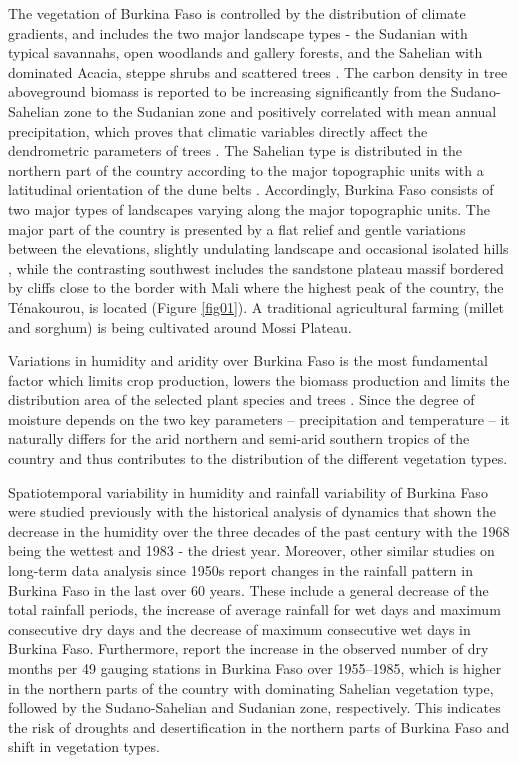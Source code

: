 \documentclass[atmosphere,article,submit,pdftex,moreauthors]{Definitions/mdpi}
\begin{document}
The vegetation of Burkina Faso is controlled by the distribution of climate gradients, and includes the two major landscape types - the Sudanian with typical savannahs, open woodlands and gallery forests, and the Sahelian with dominated Acacia, steppe shrubs and scattered trees \cite{da2010spatial}. The carbon density in tree aboveground biomass is reported to be increasing significantly from the Sudano-Sahelian zone to the Sudanian zone and positively correlated with mean annual precipitation, which proves that climatic variables directly affect the dendrometric parameters of trees \cite{BALIMA2021100123}. The Sahelian type is distributed in the northern part of the country according to the major topographic units with a latitudinal orientation of the dune belts \cite{Ballouche}. Accordingly, Burkina Faso consists of two major types of landscapes varying along the major topographic units. The major part of the country is presented by a flat relief and gentle variations between the elevations, slightly undulating landscape and occasional isolated hills \cite{Nebie}, while the contrasting southwest includes the sandstone plateau massif bordered by cliffs close to the border with Mali where the highest peak of the country, the Ténakourou, is located (Figure \ref{fig01}). A traditional agricultural farming (millet and sorghum) is being cultivated around Mossi Plateau. 

Variations in humidity and aridity over Burkina Faso is the most fundamental factor which limits crop production, lowers the biomass production and limits the distribution area of the selected plant species and trees \cite{dimobe2020climate,ADJONOU2020e04031,DIMOBE2020104237}. Since the degree of moisture depends on the two key parameters -- precipitation and temperature -- it naturally differs for the arid northern and semi-arid southern tropics of the country and thus contributes to the distribution of the different vegetation types. 

Spatiotemporal variability in humidity and rainfall variability of Burkina Faso were studied previously \cite{OGUNTUNDE20061180} with the historical analysis of dynamics that shown the decrease in the humidity over the three decades of the past century with the 1968 being the wettest and 1983 - the driest year. Moreover, other similar studies on long-term data analysis since 1950s \cite{Longueville} report changes in the rainfall pattern in Burkina Faso in the last over 60 years. These include a general decrease of the total rainfall periods, the increase of average rainfall for wet days and maximum consecutive dry days and the decrease of maximum consecutive wet days in Burkina Faso. Furthermore, \cite{BELEMTOUGRI2021100908} report the increase in the observed number of dry months per 49 gauging stations in Burkina Faso over 1955--1985, which is higher in the northern parts of the country with dominating Sahelian vegetation type, followed by the Sudano-Sahelian and Sudanian zone, respectively. This indicates the risk of droughts and desertification in the northern parts of Burkina Faso and shift in vegetation types. 
\end{document}
